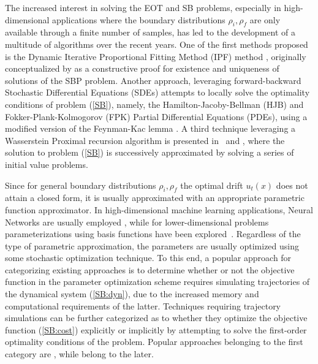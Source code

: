 \documentclass[twoside]{article}
\renewcommand{\eqref}[1]{(\ref{#1})}
\begin{document}
The increased interest in solving the EOT and SB problems, especially in high-dimensional applications where the boundary distributions $\rho_i, \rho_f$ are only available through a finite number of samples, has led to the development of a multitude of algorithms over the recent years. 
%
One of the first methods proposed is the Dynamic Iterative Proportional Fitting Method (IPF) method \citep{chen2016entropic, pavon2021data, de2021diffusion}, originally conceptualized by \cite{fortet1940resolution} as a constructive proof for existence and uniqueness of solutions of the SBP problem.
Another approach, leveraging forward-backward Stochastic Differential Equations (SDEs) attempts to locally solve the optimality conditions of problem \eqref{SB}, namely, the Hamilton-Jacoby-Bellman (HJB) and Fokker-Plank-Kolmogorov (FPK) Partial Differential Equations (PDEs), using a modified version of the Feynman-Kac lemma \citep{chen2022likelihood, liu2022deep}.
A third technique leveraging a Wasserstein Proximal recursion algorithm is presented in~\citep{caluya2021wasserstein} and \citep{bunne22proximal}, where the solution to problem \eqref{SB} is successively approximated by solving a series of initial value problems.

Since for general boundary distributions $\rho_i, \rho_f$ the optimal drift $u_t(x)$ does not attain a closed form, it is usually approximated with an appropriate parametric function approximator. 
In high-dimensional machine learning applications, Neural Networks are usually employed \citep{de2021diffusion}, while for lower-dimensional problems parameterizations using basis functions have been explored~\citep{pavon2021data}.
%
Regardless of the type of parametric approximation, the parameters are usually optimized using some stochastic optimization technique. 
%
To this end, a popular approach for categorizing existing approaches is to determine whether or not the objective function in the parameter optimization scheme requires simulating trajectories of the dynamical system \eqref{SB:dyn}, due to the increased memory and computational requirements of the latter.
%
Techniques requiring trajectory simulations can be further categorized as to whether they optimize the objective function \eqref{SB:cost} explicitly or implicitly by attempting to solve the first-order optimality conditions of the problem. Popular approaches belonging to the first category are \citep{tong2020trajectory, onken2021ot, rapakoulias2024discrete, ruthotto2020machine}, while \citep{de2021diffusion, chen2022likelihood, liu2022deep} belong to the later.
\end{document}
